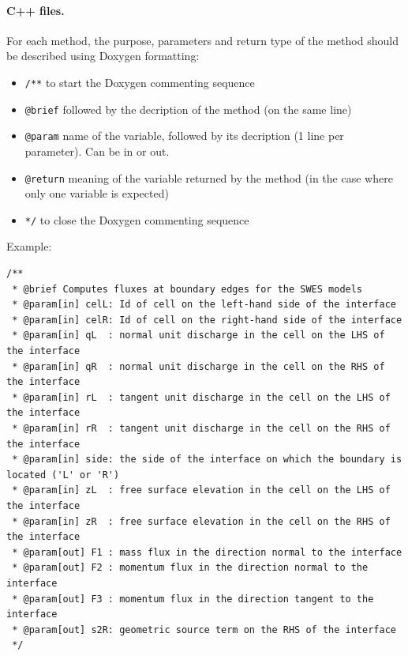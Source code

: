 \paragraph{C++ files.}
For each method, the purpose, parameters and return type of the method should be described using Doxygen formatting:
\begin{itemize}
\item \texttt{/**} to start the Doxygen commenting sequence
\item \texttt{@brief} followed by the decription of the method (on the same line)
\item \texttt{@param} name of the variable, followed by its decription (1 line per parameter). Can be in or out.
\item \texttt{@return} meaning of the variable returned by the method (in the case where only one variable is expected)
\item \texttt{*/} to close the Doxygen commenting sequence
\end{itemize}
Example:
\begin{verbatim}
/**
 * @brief Computes fluxes at boundary edges for the SWES models
 * @param[in] celL: Id of cell on the left-hand side of the interface 
 * @param[in] celR: Id of cell on the right-hand side of the interface 
 * @param[in] qL  : normal unit discharge in the cell on the LHS of the interface 
 * @param[in] qR  : normal unit discharge in the cell on the RHS of the interface 
 * @param[in] rL  : tangent unit discharge in the cell on the LHS of the interface 
 * @param[in] rR  : tangent unit discharge in the cell on the RHS of the interface 
 * @param[in] side: the side of the interface on which the boundary is located ('L' or 'R')
 * @param[in] zL  : free surface elevation in the cell on the LHS of the interface
 * @param[in] zR  : free surface elevation in the cell on the RHS of the interface
 * @param[out] F1 : mass flux in the direction normal to the interface
 * @param[out] F2 : momentum flux in the direction normal to the interface
 * @param[out] F3 : momentum flux in the direction tangent to the interface 
 * @param[out] s2R: geometric source term on the RHS of the interface
 */

\end{verbatim}
